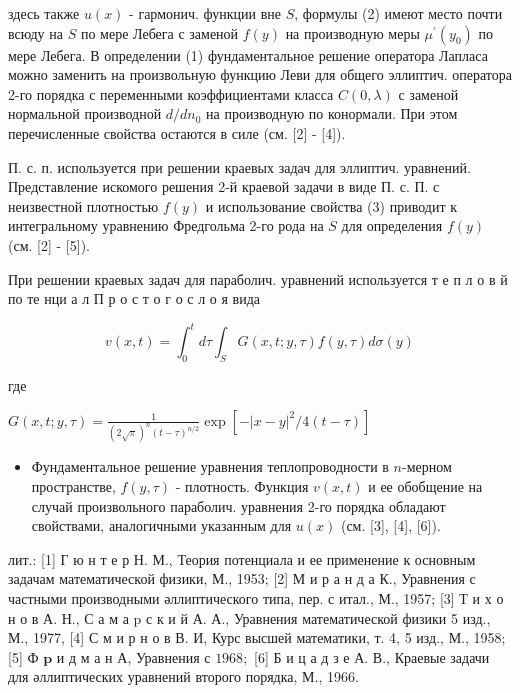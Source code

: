 \documentclass[10pt]{article}
\begin{document}
здесь также $u(x)$ - гармонич. функции вне $S$, формулы (2) имеют место почти всюду на $S$ по мере Лебега с заменой $f(y)$ на производную меры $\mu^{\prime}\left(y_{0}\right)$ по мере Лебега. В определении (1) фундаментальное решение оператора Лапласа можно заменить на произвольную функцию Леви для общего эллиптич. оператора 2-го порядка с переменными коэффициентами класса $C(0, \lambda)$ с заменой нормальной производной $d / d n_{0}$ на производную по конормали. При этом перечисленные свойства остаются в силе (см. [2] - [4]).



П. с. п. используется при решении краевых задач для эллиптич. уравнений. Представление искомого решения 2-й краевой задачи в виде П. с. П. с неизвестной плотностью $f(y)$ и использование свойства (3) приводит к интегральному уравнению Фредгольма 2-го рода на $S$ для определения $f(y)$ (см. [2] - [5]).



При решении краевых задач для параболич. уравнений используется т е п л о в й по те нци а л П р о с т о г о с л о я вида



\[

v(x, t)=\int_{0}^{t} d \tau \int_{S} G(x, t ; y, \tau) f(y, \tau) d \sigma(y)

\]



где



$G(x, t ; y, \tau)=\frac{1}{(2 \sqrt{\pi})^{n}(t-\tau)^{n / 2}} \exp \left[-|x-y|^{2} / 4(t-\tau)\right]$



\begin{itemize}

  \item Фундаментальное решение уравнения теплопроводности в $n$-мерном пространстве, $f(y, \tau)$ - плотность. Функция $v(x, t)$ и ее обобщение на случай произвольного параболич. уравнения 2-го порядка обладают свойствами, аналогичными указанным для $u(x)$ (см. [3], [4], [6]).

\end{itemize}



лит.: [1] Г ю н т е р Н. М., Теория потенциала и ее применение к основным задачам математической физики, М., 1953; [2] М и р а н д а К., Уравнения с частными производными әллиптического типа, пер. с итал., М., 1957; [3] Т и х о н о в А. Н., С а м а p с к и й А. А., Уравнения математической физики 5 изд., М., 1977, [4] С м и р н о в В. И, Курс высшей математики, т. 4, 5 изд., М., 1958; [5] Ф $\mathbf{p}$ и д м а н А, Уравнения с $1968 ;$ [6] Б и ц а д з е А. В., Краевые задачи для әллиптических уравнений второго порядка, М., 1966.
\end{document}
